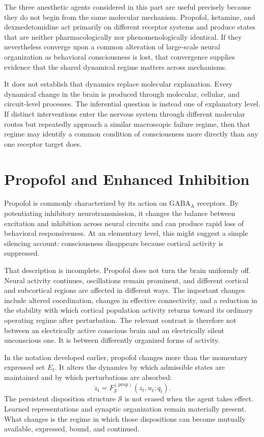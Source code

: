 \documentclass[11pt]{book}
\begin{document}
The three anesthetic agents considered in this part are useful precisely because they do not begin from the same molecular mechanism. Propofol, ketamine, and dexmedetomidine act primarily on different receptor systems and produce states that are neither pharmacologically nor phenomenologically identical. If they nevertheless converge upon a common alteration of large-scale neural organization as behavioral consciousness is lost, that convergence supplies evidence that the shared dynamical regime matters across mechanisms.

It does not establish that dynamics replace molecular explanation. Every dynamical change in the brain is produced through molecular, cellular, and circuit-level processes. The inferential question is instead one of explanatory level. If distinct interventions enter the nervous system through different molecular routes but repeatedly approach a similar macroscopic failure regime, then that regime may identify a common condition of consciousness more directly than any one receptor target does.

\section*{Propofol and Enhanced Inhibition}

Propofol is commonly characterized by its action on $\mathrm{GABA_A}$ receptors. By potentiating inhibitory neurotransmission, it changes the balance between excitation and inhibition across neural circuits and can produce rapid loss of behavioral responsiveness. At an elementary level, this might suggest a simple silencing account: consciousness disappears because cortical activity is suppressed.

That description is incomplete. Propofol does not turn the brain uniformly off. Neural activity continues, oscillations remain prominent, and different cortical and subcortical regions are affected in different ways. The important changes include altered coordination, changes in effective connectivity, and a reduction in the stability with which cortical population activity returns toward its ordinary operating regime after perturbation. The relevant contrast is therefore not between an electrically active conscious brain and an electrically silent unconscious one. It is between differently organized forms of activity.

In the notation developed earlier, propofol changes more than the momentary expressed set $E_t$. It alters the dynamics by which admissible states are maintained and by which perturbations are absorbed:
\[
\dot z_t
=
F_{\mathcal S}^{(\mathrm{prop})}
\left(
z_t,u_t;q_t
\right).
\]
The persistent disposition structure $\mathcal S$ is not erased when the agent takes effect. Learned representations and synaptic organization remain materially present. What changes is the regime in which those dispositions can become mutually available, expressed, bound, and continued.
\end{document}

